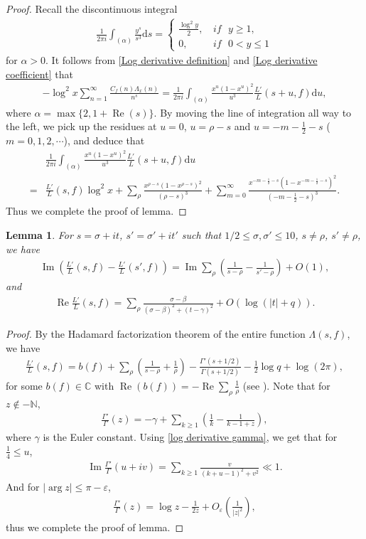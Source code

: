 \documentclass[11pt,reqno]{amsart}
\newcommand{\bea}{\begin{eqnarray}}
\newcommand{\eea}{\end{eqnarray}}
\newcommand{\bna}{\begin{eqnarray*}}
\newcommand{\ena}{\end{eqnarray*}}
\numberwithin{equation}{section}
\theoremstyle{plain}
\newtheorem{lemma}{Lemma}[section]
\theoremstyle{definition}
\renewcommand{\Re}{\operatorname{Re}}
\renewcommand{\Im}{\operatorname{Im}}
\begin{document}
\begin{proof}
Recall the discontinuous integral
\bna
\frac{1}{2\pi i}\int_{(\alpha)}\frac{y^s}{s^3}\mathrm{d}s=
\begin{cases}
\frac{\log^2 y}{2}, \,&\textit{if }\,\, y\geq 1,\\
0, \,& \textit{if }\,\, 0<y\leq 1
\end{cases}
\ena
for $\alpha>0$.
It follows from \eqref{Log derivative definition} and \eqref{Log derivative coefficient} that
\bna
-\log^2x\sum_{n=1}^\infty \frac{C_f(n)\Lambda_x(n)}{n^s}=
\frac{1}{2\pi i}\int_{(\alpha)}\frac{x^u(1-x^u)^2}{u^3}\frac{L'}{L}(s+u,f)\mathrm{d}u,
\ena
where $\alpha=\max \{2, 1+\Re(s)\}$. By moving the line of integration all way to the left, we
pick up the residues at $u=0$, $u=\rho-s$ and $u=-m-\frac{1}{2}-s$ ($m= 0,1,2, \cdots$), and deduce that
\begin{equation*}
\begin{split}
&\frac{1}{2\pi i}\int_{(\alpha)}\frac{x^u(1-x^u)^2}{u^3}\frac{L'}{L}(s+u,f)\mathrm{d}u\\
=&\frac{L'}{L}(s,f)\log^2x+\sum_\rho\frac{x^{\rho-s}(1-x^{\rho-s})^2}{(\rho-s)^3}
+\sum_{m=0}^\infty\frac{x^{-m-\frac{1}{2}-s}(1-x^{-m-\frac{1}{2}-s})^2}{(-m-\frac{1}{2}-s)^3}.
\end{split}
\end{equation*}
Thus we complete the proof of lemma.
\end{proof}
\begin{lemma}\label{lemma 2}
For $s=\sigma+it$, $s'=\sigma'+it'$ such that $1/2\leq \sigma, \sigma'\leq 10$, $s\neq \rho$, $s'\neq \rho$,
we have
\bna\label{Im}
\Im\left(\frac{L'}{L}(s,f)-\frac{L'}{L}(s',f)\right)=\Im\sum_\rho\left(\frac{1}{s-\rho}-\frac{1}{s'-\rho}\right)+O(1),
\ena
and
\bea\label{Re}
\Re\frac{L'}{L}(s,f)=\sum_\rho\frac{\sigma-\beta}{(\sigma-\beta)^2+(t-\gamma)^2}+O(\log(|t|+q)).
\eea
\end{lemma}
\begin{proof}
By the Hadamard factorization theorem of the entire function $\Lambda(s,f)$, we have
\bna
\frac{L'}{L}(s,f)=b(f)+\sum_\rho\left(\frac{1}{s-\rho}+\frac{1}{\rho}\right)
-\frac{\Gamma'(s+1/2)}{\Gamma(s+1/2)}-\frac{1}{2}\log q+\log(2\pi),
\ena
for some $b(f)\in \mathbb{C}$ with $\Re(b(f))=-\Re\sum_\rho\frac{1}{\rho}$ (see \cite[Proposition 5.7 (3)]{IK}).
Note that for $z\not\in -\mathbb{N}$,
\bea\label{log derivative gamma}
\frac{\Gamma'}{\Gamma}(z)=-\gamma+\sum_{k\geq 1}\left(\frac{1}{k}-\frac{1}{k-1+z}\right),
\eea
where $\gamma$ is the Euler constant.
Using \eqref{log derivative gamma}, we get that for $\frac{1}{4}\leq u$,
\bna
\Im\frac{\Gamma'}{\Gamma}(u+iv)=\sum_{k\geq 1}\frac{v}{(k+u-1)^2+v^2}\ll 1.
\ena
And for $|\arg z|\leq \pi-\varepsilon$,
\bna\label{derivative gamma}
\frac{\Gamma'}{\Gamma}(z)=\log z-\frac{1}{2z}+O_\varepsilon\left(\frac{1}{|z|^2}\right),
\ena
thus we complete the proof of lemma.
\end{proof}
\end{document}
